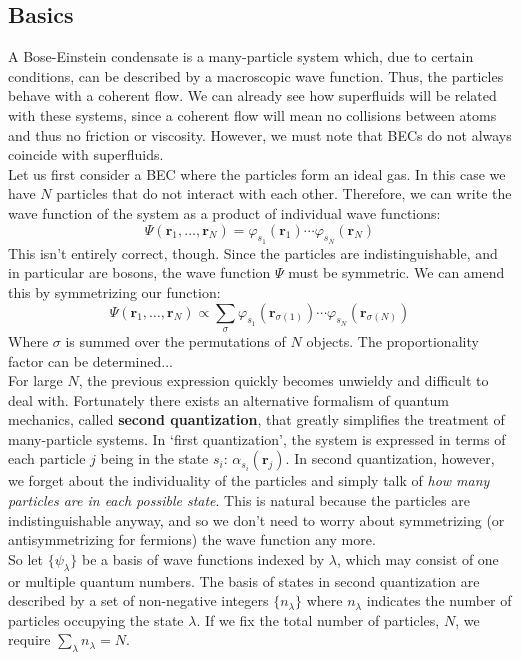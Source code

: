 \documentclass{article}
\begin{document}
\subsection{Basics}

A Bose-Einstein condensate is a many-particle system which, due to certain
conditions, can be described by a macroscopic wave function.  Thus, the particles
behave with a coherent flow.  We can already see how superfluids will be related
with these systems, since a coherent flow will mean no collisions between atoms
and thus no friction or viscosity.  However, we must note that BECs do not always
coincide with superfluids.
\\

Let us first consider a BEC where the particles form an ideal gas.  In this case we have $N$ particles that do not interact with each other.  Therefore, we can write the wave function of the system as a product of
individual wave functions:
\[\Psi(\mathbf{r}_1, \dots, \mathbf{r}_N) =
    \varphi_{s_1}(\mathbf{r}_1)\dotsb\varphi_{s_N}(\mathbf{r}_N)\]
This isn't entirely correct, though.  Since the particles are indistinguishable, and in particular are bosons, the wave function $\Psi$ must be symmetric.  We can amend this by symmetrizing our function:
\[\Psi(\mathbf{r}_1, \dots, \mathbf{r}_N) \propto \sum_{\sigma}
        \varphi_{s_1}(\mathbf{r}_{\sigma(1)})\dotsb
        \varphi_{s_N}(\mathbf{r}_{\sigma(N)})\]
Where $\sigma$ is summed over the permutations of $N$ objects.  The proportionality factor can be determined...
\\

For large $N$, the previous expression quickly becomes unwieldy and difficult to deal with.  Fortunately there exists an alternative formalism of quantum mechanics, called \textbf{second quantization}, that greatly simplifies the treatment of many-particle systems.  In `first quantization', the system is expressed in terms of each particle $j$ being in the state $s_i$: $\alpha_{s_i}(\mathbf{r}_j)$.  In second quantization, however, we forget about the individuality of the particles and simply talk of \textit{how many particles are in each possible state}.  This is natural because the particles are indistinguishable anyway, and so we don't need to worry about symmetrizing (or antisymmetrizing for fermions) the wave function any more.
\\

So let $\{\psi_\lambda\}$ be a basis of wave functions indexed by $\lambda$, which may consist of one or multiple quantum numbers.  The basis of states in second quantization are described by a set of non-negative integers $\{n_\lambda\}$ where $n_\lambda$ indicates the number of particles occupying the state $\lambda$.  If we fix the total number of particles, $N$, we require $\sum_\lambda{n_\lambda} = N$.
\\
\end{document}
